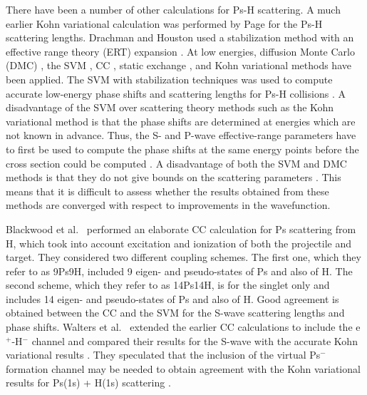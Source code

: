 \documentclass[reprint,showpacs,preprintnumbers,amsmath,amssymb,pra,aps]{revtex4-1}
\begin{document}
There have been a number of other calculations for
Ps-H scattering. A much earlier Kohn variational calculation was performed
by Page \cite{Page1976} for the Ps-H scattering lengths. Drachman and Houston used a stabilization method with an effective range theory (ERT) expansion \cite{Drachman1975,Drachman1976}.
At low energies, diffusion Monte Carlo (DMC) \cite{Chiesa2002},
the SVM \cite{Ivanov2001,Ivanov2002}, CC \cite{Sinha1997,Campbell1998,Adhikari1999,Sinha2000,Blackwood2002,Blackwood2002b,Walters2004}, static exchange \cite{Hara1975,Ray1997}, and Kohn variational \cite{Page1976,VanReeth2003,VanReeth2004} methods have been applied.
The SVM with stabilization techniques was used to compute
accurate low-energy phase shifts and scattering lengths for Ps-H collisions \cite{Ivanov2001,Ivanov2002}.
A disadvantage of the SVM over scattering theory methods
such as the Kohn variational method is that the phase shifts
are determined at energies which are not known in advance.
Thus, the S- and P-wave
effective-range parameters have to first be used to compute the phase shifts at the same energy
points before the cross section could be computed \cite{Ivanov2002}. 
A disadvantage of both the SVM 
and DMC methods is that they do not give
bounds on the scattering parameters \cite{VanReeth2003}.
This means that it is difficult to assess whether the results
obtained from these methods are converged with respect
to improvements in the wavefunction.

Blackwood et al.~\cite{Blackwood2002} performed an elaborate CC calculation for Ps scattering from H, which took into account excitation and ionization of both the projectile and target. They considered two different coupling schemes.
The first one, which they refer to as 9Ps9H, included 9 eigen- and pseudo-states of Ps and also of H. The second scheme, which they refer to as 14Ps14H, is for the singlet only and includes 14 eigen- and pseudo-states of Ps and also of H.
Good agreement is obtained between the CC \cite{Blackwood2002} and the SVM \cite{Ivanov2002}
for the S-wave scattering lengths and phase shifts. Walters et al.~\cite{Walters2004} extended the earlier CC calculations \cite{Blackwood2002} to include the e$^+$-H$^-$ channel \cite{Blackwood2002b} and compared their results for the S-wave with the accurate
Kohn variational results \cite{VanReeth2003}.
They speculated that the inclusion of the virtual Ps$^-$ formation channel may
be needed to obtain agreement with the Kohn variational results
for Ps(1s) + H(1s) scattering \cite{Blackwood2002}.
\end{document}

